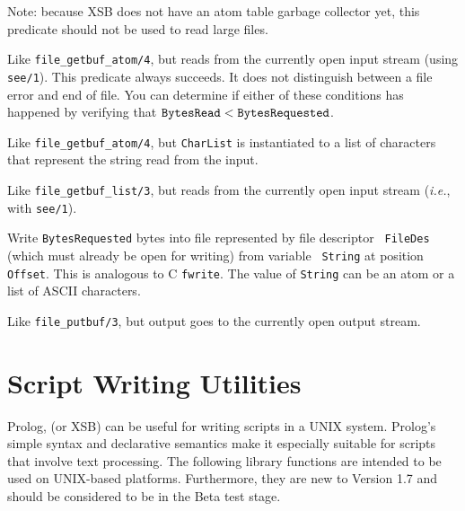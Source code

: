 \begin{description}
Note: because XSB does not have an atom table garbage collector yet, this
predicate should not be used to read large files.

Like \verb|file_getbuf_atom/4|, but reads from the currently open input stream
(using {\tt see/1}). This predicate always
succeeds. It does not distinguish between a file error and end of file.
You can determine if either of these conditions has happened by verifying
that $\tt BytesRead < BytesRequested$.

Like \verb|file_getbuf_atom/4|, but {\tt CharList} is instantiated to a list
of characters that represent the string read from the input.

Like \verb|file_getbuf_list/3|, but reads from the currently open input stream
({\it i.e.}, with {\tt see/1}).


Write {\tt BytesRequested} bytes into file represented by file descriptor {\tt
  FileDes} (which must already be open for writing) from variable {\tt
  String} at position {\tt Offset}. This is analogous to C {\tt fwrite}.
The value of {\tt String} can be an atom or a list of ASCII characters.

Like \verb|file_putbuf/3|, but output goes to the currently open output stream.


\end{description}

\section{Script Writing Utilities}

Prolog, (or XSB) can be useful for writing scripts in a UNIX system.
Prolog's simple syntax and declarative semantics make it especially
suitable for scripts that involve text processing.  The following
library functions are intended to be used on UNIX-based platforms.
Furthermore, they are new to Version 1.7 and should be considered to
be in the Beta test stage.

